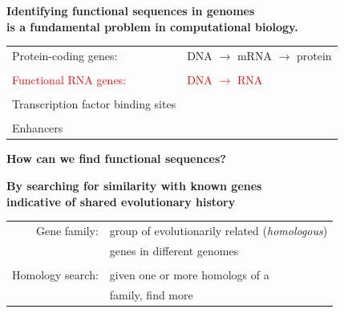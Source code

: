 \documentclass[landscape]{slides}
\begin{document}
\begin{slide}
\begin{center}
\textbf{Identifying functional sequences in genomes \\
  is a fundamental problem in computational biology.}
\end{center}
\medskip

\begin{center}
\begin{tabular}{ll}
Protein-coding genes: & DNA $\rightarrow$ mRNA $\rightarrow$ protein \\
& \\
\textcolor{red}{Functional RNA genes:} & \textcolor{red}{DNA  $\rightarrow$ RNA} \\
& \\
Transcription factor binding sites & \\
& \\
Enhancers & \\
\end{tabular}
\medskip

\medskip

\medskip

\medskip

\textbf{How can we find functional sequences?}

{\bf By searching for similarity with known genes \\
indicative of shared evolutionary history}

\begin{tabular}{rl}
Gene family: & group of evolutionarily related ({\em homologous}) \\
& genes in different genomes \\
& \\
Homology search: & given one or more homologs of a \\
& family, find more \\
\end{tabular}




\end{center}

\vfill
\end{slide}
\end{document}
